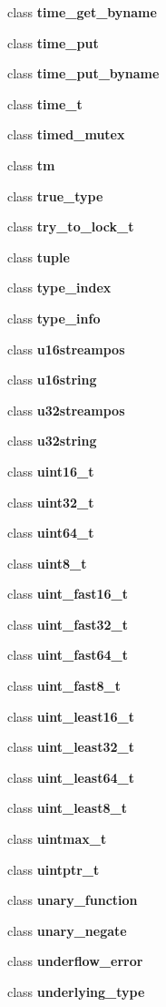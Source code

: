 \begin{DoxyCompactItemize}
class \textbf{ time\+\_\+get\+\_\+byname}
\item 
class \textbf{ time\+\_\+put}
\item 
class \textbf{ time\+\_\+put\+\_\+byname}
\item 
class \textbf{ time\+\_\+t}
\item 
class \textbf{ timed\+\_\+mutex}
\item 
class \textbf{ tm}
\item 
class \textbf{ true\+\_\+type}
\item 
class \textbf{ try\+\_\+to\+\_\+lock\+\_\+t}
\item 
class \textbf{ tuple}
\item 
class \textbf{ type\+\_\+index}
\item 
class \textbf{ type\+\_\+info}
\item 
class \textbf{ u16streampos}
\item 
class \textbf{ u16string}
\item 
class \textbf{ u32streampos}
\item 
class \textbf{ u32string}
\item 
class \textbf{ uint16\+\_\+t}
\item 
class \textbf{ uint32\+\_\+t}
\item 
class \textbf{ uint64\+\_\+t}
\item 
class \textbf{ uint8\+\_\+t}
\item 
class \textbf{ uint\+\_\+fast16\+\_\+t}
\item 
class \textbf{ uint\+\_\+fast32\+\_\+t}
\item 
class \textbf{ uint\+\_\+fast64\+\_\+t}
\item 
class \textbf{ uint\+\_\+fast8\+\_\+t}
\item 
class \textbf{ uint\+\_\+least16\+\_\+t}
\item 
class \textbf{ uint\+\_\+least32\+\_\+t}
\item 
class \textbf{ uint\+\_\+least64\+\_\+t}
\item 
class \textbf{ uint\+\_\+least8\+\_\+t}
\item 
class \textbf{ uintmax\+\_\+t}
\item 
class \textbf{ uintptr\+\_\+t}
\item 
class \textbf{ unary\+\_\+function}
\item 
class \textbf{ unary\+\_\+negate}
\item 
class \textbf{ underflow\+\_\+error}
\item 
class \textbf{ underlying\+\_\+type}

\end{DoxyCompactItemize}
